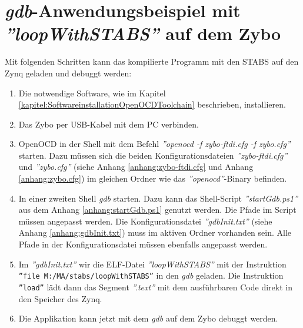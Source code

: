 


\section{\textit{gdb}-Anwendungsbeispiel mit \textit{''loopWithSTABS''} auf dem Zybo}
Mit folgenden Schritten kann das kompilierte Programm mit den STABS auf den Zynq geladen und debuggt werden:

\begin{enumerate}
	\item Die notwendige Software, wie im Kapitel \ref{kapitel:SoftwareinstallationOpenOCDToolchain} beschrieben, installieren.
	\item Das Zybo per USB-Kabel mit dem PC verbinden.
	\item OpenOCD in der Shell mit dem Befehl \textit{''openocd -f zybo-ftdi.cfg -f zybo.cfg''} starten.
	       Dazu müssen sich die beiden Konfigurationsdateien \textit{''zybo-ftdi.cfg''} und \textit{''zybo.cfg''} (siehe Anhang \ref{anhang:zybo-ftdi.cfg} und Anhang \ref{anhang:zybo.cfg}) im gleichen Ordner wie das \textit{''openocd''}-Binary befinden.
	\item In einer zweiten Shell \textit{gdb} starten.
	       Dazu kann das Shell-Script \textit{''startGdb.ps1''} aus dem Anhang \ref{anhang:startGdb.ps1} genutzt werden.
	       Die Pfade im Script müssen angepasst werden.
	       Die Konfigurationsdatei \textit{''gdbInit.txt''} (siehe Anhang \ref{anhang:gdbInit.txt}) muss im aktiven Ordner vorhanden sein.
	       Alle Pfade in der Konfigurationsdatei müssen ebenfalls angepasst werden.
	\item Im \textit{''gdbInit.txt''} wir die ELF-Datei \textit{''loopWithSTABS''} mit der Instruktion \texttt{''file M:/MA/stabs/loopWithSTABS''} in den \textit{gdb} geladen. Die Instruktion \texttt{''load''} lädt dann das Segment \textit{''.text''} mit dem ausführbaren Code direkt in den Speicher des Zynq.
	\item Die Applikation kann jetzt mit dem \textit{gdb} auf dem Zybo debuggt werden.
\end{enumerate}

















